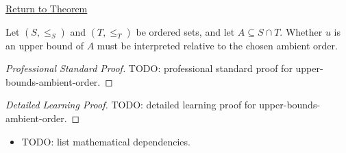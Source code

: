 \newpage
{}
\label{prf:upper-bounds-ambient-order}

\begin{remark*}[Return]
\hyperref[prop:upper-bounds-ambient-order]{Return to Theorem}
\end{remark*}

\begin{proposition*}
Let $(S,\le_S)$ and $(T,\le_T)$ be ordered sets, and let $A\subseteq S\cap T$. Whether $u$ is an upper bound of $A$ must be interpreted relative to the chosen ambient order.
\end{proposition*}

\begin{proof}[Professional Standard Proof]
\LRAProofBodyStart
TODO: professional standard proof for upper-bounds-ambient-order.
\end{proof}

\begin{proof}[Detailed Learning Proof]
\LRAProofBodyStart
TODO: detailed learning proof for upper-bounds-ambient-order.
\end{proof}

\begin{remark*}
\end{remark*}

\begin{dependencies}
\begin{itemize}
  \item TODO: list mathematical dependencies.
\end{itemize}
\end{dependencies}

\clearpage
